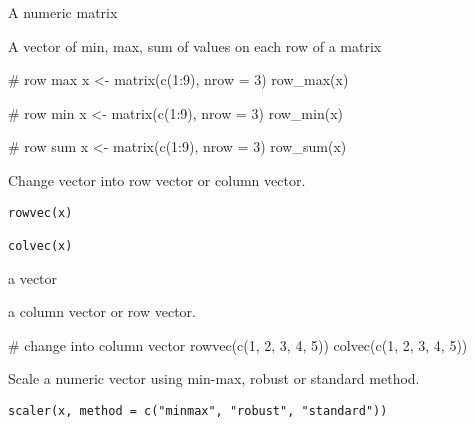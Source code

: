 \documentclass[letterpaper]{book}
\begin{document}
%
\begin{Arguments}
\begin{ldescription}
\item[\code{x}] A numeric matrix
\end{ldescription}
\end{Arguments}
%
\begin{Value}
A vector of min, max, sum of values on each row of a matrix
\end{Value}
%
\begin{Examples}
\begin{ExampleCode}
# row max
x <- matrix(c(1:9), nrow = 3)
row_max(x)

# row min
x <- matrix(c(1:9), nrow = 3)
row_min(x)

# row sum
x <- matrix(c(1:9), nrow = 3)
row_sum(x)

\end{ExampleCode}
\end{Examples}
%
\begin{Description}
Change vector into row vector or column vector.
\end{Description}
%
\begin{Usage}
\begin{verbatim}
rowvec(x)

colvec(x)
\end{verbatim}
\end{Usage}
%
\begin{Arguments}
\begin{ldescription}
\item[\code{x}] a vector
\end{ldescription}
\end{Arguments}
%
\begin{Value}
a column vector or row vector.
\end{Value}
%
\begin{Examples}
\begin{ExampleCode}
# change into column vector
rowvec(c(1, 2, 3, 4, 5))
colvec(c(1, 2, 3, 4, 5))

\end{ExampleCode}
\end{Examples}
%
\begin{Description}
Scale a numeric vector using min-max, robust or standard method.
\end{Description}
%
\begin{Usage}
\begin{verbatim}
scaler(x, method = c("minmax", "robust", "standard"))
\end{verbatim}
\end{Usage}
\end{document}
